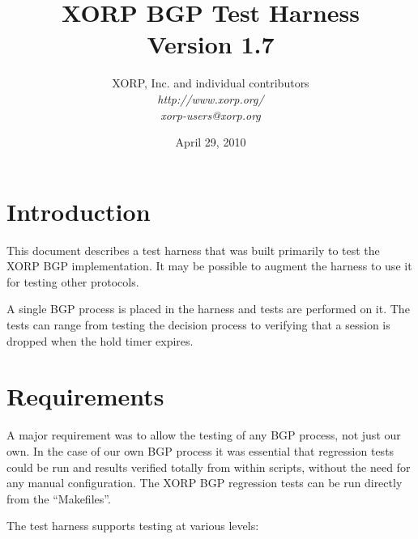\documentclass[11pt]{article}
\begin{document}
\title{XORP BGP Test Harness \\
\vspace{1ex}
Version 1.7}
\author{ XORP, Inc. and individual contributors		\\
         {\it http://www.xorp.org/}			\\
	 {\it xorp-users@xorp.org}
}
\date{April 29, 2010}

\maketitle


%
%
\newcommand{\coordinator}{{\em coordinator}\xspace}
\newcommand{\testpeer}{{\em test peer}\xspace}
\newcommand{\testpeers}{{\em test peers}\xspace}

\section{Introduction}

This document describes a test harness that was built primarily to
test the XORP BGP implementation. It may be possible to augment the
harness to use it for testing other protocols.

A single BGP process is placed in the harness and tests
are performed on it. The tests can range from testing the decision
process to verifying that a session is dropped when the hold timer expires.

\section{Requirements}

A major requirement was to allow the testing of any BGP process, not
just our own. In the case of our own BGP process it was essential that
regression tests could be run and results verified totally from within
scripts, without the need for any manual configuration. The
XORP BGP regression tests can be run directly from the ``Makefiles''.
\newline

The test harness supports testing at various levels:
\end{document}
